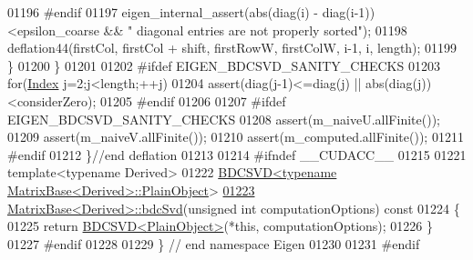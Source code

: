 \begin{DoxyCode}
01196 \textcolor{preprocessor}{#endif}
01197         eigen\_internal\_assert(abs(diag(i) - diag(i-1))<epsilon\_coarse && \textcolor{stringliteral}{" diagonal entries are not
       properly sorted"});
01198         deflation44(firstCol, firstCol + shift, firstRowW, firstColW, i-1, i, length);
01199       \}
01200   \}
01201   
01202 \textcolor{preprocessor}{#ifdef EIGEN\_BDCSVD\_SANITY\_CHECKS}
01203   \textcolor{keywordflow}{for}(\hyperlink{namespace_eigen_a62e77e0933482dafde8fe197d9a2cfde}{Index} j=2;j<length;++j)
01204     assert(diag(j-1)<=diag(j) || abs(diag(j))<considerZero);
01205 \textcolor{preprocessor}{#endif}
01206   
01207 \textcolor{preprocessor}{#ifdef EIGEN\_BDCSVD\_SANITY\_CHECKS}
01208   assert(m\_naiveU.allFinite());
01209   assert(m\_naiveV.allFinite());
01210   assert(m\_computed.allFinite());
01211 \textcolor{preprocessor}{#endif}
01212 \}\textcolor{comment}{//end deflation}
01213 
01214 \textcolor{preprocessor}{#ifndef \_\_CUDACC\_\_}
01215 
01221 \textcolor{keyword}{template}<\textcolor{keyword}{typename} Derived>
01222 \hyperlink{group___s_v_d___module_class_eigen_1_1_b_d_c_s_v_d}{BDCSVD<typename MatrixBase<Derived>::PlainObject}>
\hyperlink{group___core___module_ae171b74b5d530846ee0836135ffcf837}{01223} \hyperlink{group___core___module_ae171b74b5d530846ee0836135ffcf837}{MatrixBase<Derived>::bdcSvd}(\textcolor{keywordtype}{unsigned} \textcolor{keywordtype}{int} computationOptions)\textcolor{keyword}{ const}
01224 \textcolor{keyword}{}\{
01225   \textcolor{keywordflow}{return} \hyperlink{group___s_v_d___module_class_eigen_1_1_b_d_c_s_v_d}{BDCSVD<PlainObject>}(*\textcolor{keyword}{this}, computationOptions);
01226 \}
01227 \textcolor{preprocessor}{#endif}
01228 
01229 \} \textcolor{comment}{// end namespace Eigen}
01230 
01231 \textcolor{preprocessor}{#endif}
\end{DoxyCode}
